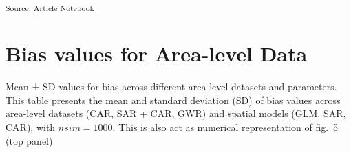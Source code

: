 \documentclass[
  default,
]{sn-jnl}
\begin{document}
\textsubscript{Source:
\href{https://indiraputeri-phd.github.io/CAR_simcomp/manuscript.qmd.html}{Article
Notebook}}

\section{Bias values for Area-level Data}\label{secA2}

\begin{table}

\caption{\label{tbl-bias1}Mean ± SD values for bias across different
area-level datasets and parameters. This table presents the mean and
standard deviation (SD) of bias values across area-level datasets (CAR,
SAR + CAR, GWR) and spatial models (GLM, SAR, CAR), with
\(nsim = 1000\). This is also act as numerical representation of fig.~5
(top panel)}

\centering{

[!h]
\centering\begingroup\fontsize{9}{11}\selectfont

}
\end{table}
\end{document}
